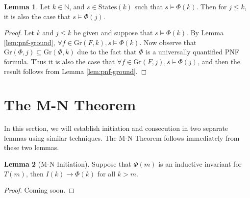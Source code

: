 \documentclass[12pt]{article}
\theoremstyle{definition}
\newtheorem{lemma}{Lemma}
\theoremstyle{remark}
\newcommand{\msp}{\text{ }}
\newcommand{\states}{\text{States}}
\newcommand{\gr}{\text{Gr}}
\newcommand{\perm}{\genfrac{}{}{0pt}{}}
\begin{document}
\begin{lemma}
  \label{lem:lt-sat}
  Let $k \in \mathbb{N}$, and $s \in \states(k)$ such that $s \models \Phi(k)$.  Then for $j \leq k$, it is also the case that $s \models \Phi(j)$.
\end{lemma}
\begin{proof}
  Let $k$ and $j \leq k$ be given and suppose that $s \models \Phi(k)$.  By Lemma \ref{lem:pnf-ground}, $\forall f \in \gr(F,k), s \models \Phi(k)$.  Now observe that $\gr(\Phi,j) \subseteq \gr(\Phi,k)$ due to the fact that $\Phi$ is a universally quantified PNF formula.  Thus it is also the case that $\forall f \in \gr(F,j), s \models \Phi(j)$, and then the result follows from Lemma \ref{lem:pnf-ground}.
\end{proof}



\section{The M-N Theorem}

In this section, we will establish initiation and consecution in two separate lemmas using similar techniques.  The M-N Theorem follows immediately from these two lemmas.

\begin{lemma}[M-N Initiation]
  Suppose that $\Phi(m)$ is an inductive invariant for $T(m)$, then $I(k) \rightarrow \Phi(k)$ for all $k>m$.
\end{lemma}
\begin{proof}
  Coming soon.


\end{proof}
\end{document}
